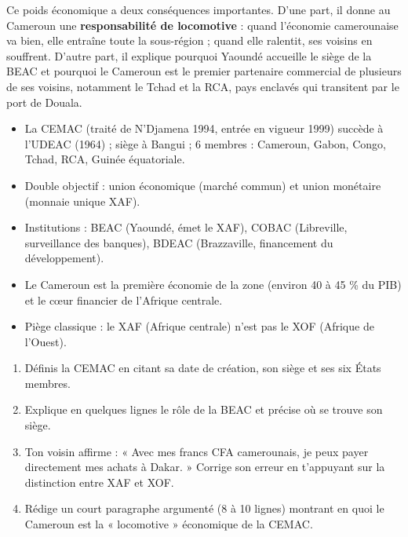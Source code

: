 \documentclass[11pt]{article}
\begin{document}
Ce poids économique a deux conséquences importantes. D'une part, il donne au Cameroun une \textbf{responsabilité de locomotive} : quand l'économie camerounaise va bien, elle entraîne toute la sous-région ; quand elle ralentit, ses voisins en souffrent. D'autre part, il explique pourquoi Yaoundé accueille le siège de la BEAC et pourquoi le Cameroun est le premier partenaire commercial de plusieurs de ses voisins, notamment le Tchad et la RCA, pays enclavés qui transitent par le port de Douala.

\begin{aretenir}
\begin{itemize}
\item La CEMAC (traité de N'Djamena 1994, entrée en vigueur 1999) succède à l'UDEAC (1964) ; siège à Bangui ; 6 membres : Cameroun, Gabon, Congo, Tchad, RCA, Guinée équatoriale.
\item Double objectif : union économique (marché commun) et union monétaire (monnaie unique XAF).
\item Institutions : BEAC (Yaoundé, émet le XAF), COBAC (Libreville, surveillance des banques), BDEAC (Brazzaville, financement du développement).
\item Le Cameroun est la première économie de la zone (environ 40 à 45 \% du PIB) et le cœur financier de l'Afrique centrale.
\item Piège classique : le XAF (Afrique centrale) n'est pas le XOF (Afrique de l'Ouest).
\end{itemize}
\end{aretenir}

\begin{exercice}
\begin{enumerate}
\item Définis la CEMAC en citant sa date de création, son siège et ses six États membres.
\item Explique en quelques lignes le rôle de la BEAC et précise où se trouve son siège.
\item Ton voisin affirme : « Avec mes francs CFA camerounais, je peux payer directement mes achats à Dakar. » Corrige son erreur en t'appuyant sur la distinction entre XAF et XOF.
\item Rédige un court paragraphe argumenté (8 à 10 lignes) montrant en quoi le Cameroun est la « locomotive » économique de la CEMAC.
\end{enumerate}
\end{exercice}
\end{document}
